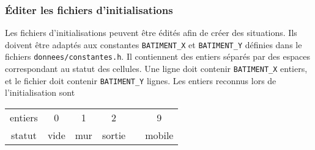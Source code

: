 \subsubsection{Éditer les fichiers d'initialisations}
Les fichiers d'initialisations peuvent être édités afin de créer des situations. Ils doivent être adaptés aux constantes \texttt{BATIMENT\_X} et \texttt{BATIMENT\_Y} définies dans le fichiers \texttt{donnees/constantes.h}. Il contiennent des entiers séparés par des espaces correspondant au statut des cellules. Une ligne doit contenir \texttt{BATIMENT\_X} entiers, et le fichier doit contenir \texttt{BATIMENT\_Y} lignes. Les entiers reconnus lors de l'initialisation sont

\begin{center}
\begin{tabular}{cccccc}
entiers & 0 & 1 & 2 &  & 9 \\
statut & vide & mur & sortie &  & mobile \\
\end{tabular}
\end{center}
%











